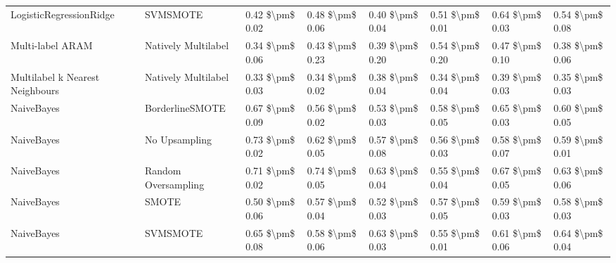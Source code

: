 \begin{tabular}{llllllll}
        LogisticRegressionRidge &                      SVMSMOTE &     0.42 \$\textbackslash pm\$ 0.02 &           0.48 \$\textbackslash pm\$ 0.06 &       0.40 \$\textbackslash pm\$ 0.04 &        0.51 \$\textbackslash pm\$ 0.01 &                         0.64 \$\textbackslash pm\$ 0.03 & 0.54 \$\textbackslash pm\$ 0.08 \\
               Multi-label ARAM &           Natively Multilabel &     0.34 \$\textbackslash pm\$ 0.06 &           0.43 \$\textbackslash pm\$ 0.23 &       0.39 \$\textbackslash pm\$ 0.20 &        0.54 \$\textbackslash pm\$ 0.20 &                         0.47 \$\textbackslash pm\$ 0.10 & 0.38 \$\textbackslash pm\$ 0.06 \\
Multilabel k Nearest Neighbours &           Natively Multilabel &     0.33 \$\textbackslash pm\$ 0.03 &           0.34 \$\textbackslash pm\$ 0.02 &       0.38 \$\textbackslash pm\$ 0.04 &        0.34 \$\textbackslash pm\$ 0.04 &                         0.39 \$\textbackslash pm\$ 0.03 & 0.35 \$\textbackslash pm\$ 0.03 \\
                     NaiveBayes &               BorderlineSMOTE &     0.67 \$\textbackslash pm\$ 0.09 &           0.56 \$\textbackslash pm\$ 0.02 &       0.53 \$\textbackslash pm\$ 0.03 &        0.58 \$\textbackslash pm\$ 0.05 &                         0.65 \$\textbackslash pm\$ 0.03 & 0.60 \$\textbackslash pm\$ 0.05 \\
                     NaiveBayes &                 No Upsampling &     0.73 \$\textbackslash pm\$ 0.02 &           0.62 \$\textbackslash pm\$ 0.05 &       0.57 \$\textbackslash pm\$ 0.08 &        0.56 \$\textbackslash pm\$ 0.03 &                         0.58 \$\textbackslash pm\$ 0.07 & 0.59 \$\textbackslash pm\$ 0.01 \\
                     NaiveBayes &           Random Oversampling &     0.71 \$\textbackslash pm\$ 0.02 &           0.74 \$\textbackslash pm\$ 0.05 &       0.63 \$\textbackslash pm\$ 0.04 &        0.55 \$\textbackslash pm\$ 0.04 &                         0.67 \$\textbackslash pm\$ 0.05 & 0.63 \$\textbackslash pm\$ 0.06 \\
                     NaiveBayes &                         SMOTE &     0.50 \$\textbackslash pm\$ 0.06 &           0.57 \$\textbackslash pm\$ 0.04 &       0.52 \$\textbackslash pm\$ 0.03 &        0.57 \$\textbackslash pm\$ 0.05 &                         0.59 \$\textbackslash pm\$ 0.03 & 0.58 \$\textbackslash pm\$ 0.03 \\
                     NaiveBayes &                      SVMSMOTE &     0.65 \$\textbackslash pm\$ 0.08 &           0.58 \$\textbackslash pm\$ 0.06 &       0.63 \$\textbackslash pm\$ 0.03 &        0.55 \$\textbackslash pm\$ 0.01 &                         0.61 \$\textbackslash pm\$ 0.06 & 0.64 \$\textbackslash pm\$ 0.04 \\

\end{tabular}
